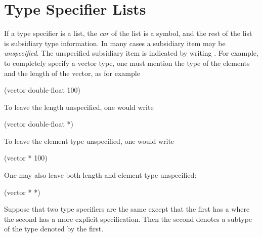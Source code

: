 \section{Type Specifier Lists}

If a type specifier is a list, the \emph{car}
of the list is a symbol, and the rest of the list is subsidiary
type information.  In many cases a subsidiary item may be
\emph{unspecified}.  The unspecified subsidiary item is indicated
by writing \cdf{*}.  For example, to completely specify
a vector type, one must mention the type of the elements
and the length of the vector, as for example
\begin{lisp}
(vector double-float 100)
\end{lisp}
To leave the length unspecified, one would write
\begin{lisp}
(vector double-float *)
\end{lisp}

To leave the element type unspecified, one would write
\begin{lisp}
(vector * 100)
\end{lisp}
\begin{newer}
\noindent
One may also leave both length and element type unspecified:
\begin{lisp}
(vector * *)
\end{lisp}
\end{newer}
Suppose that two type specifiers are the same except that the first
has a \cdf{*} where the second has a more explicit specification.
Then the second denotes a subtype of the type denoted by the first.

